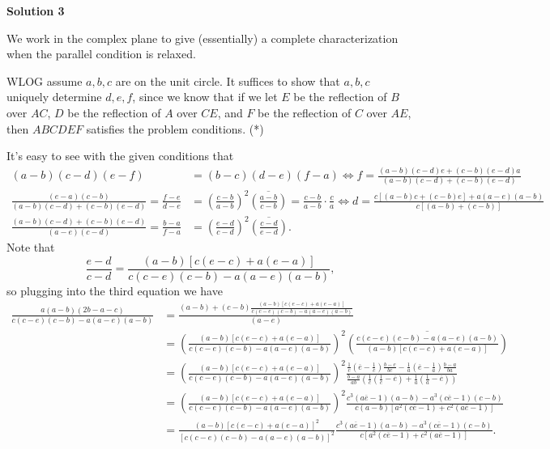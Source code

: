 \begin{enumerate}
 



\textbf{Solution 3}

We work in the complex plane to give (essentially) a complete characterization when the parallel condition is relaxed.

 WLOG assume $a,b,c$ are on the unit circle. It suffices to show that $a,b,c$ uniquely determine $d,e,f$, since we know that if we let $E$ be the reflection of $B$ over $AC$, $D$ be the reflection of $A$ over $CE$, and $F$ be the reflection of $C$ over $AE$, then $ABCDEF$ satisfies the problem conditions. (*)

 It's easy to see with the given conditions that
 \begin{align*} (a-b)(c-d)(e-f) &= (b-c)(d-e)(f-a) \Longleftrightarrow f=\frac{(a-b)(c-d)e+(c-b)(e-d)a}{(a-b)(c-d)+(c-b)(e-d)} \\ \frac{(e-a)(c-b)}{(a-b)(c-d)+(c-b)(e-d)} = \frac{f-e}{d-e} &= \left(\frac{c-b}{a-b}\right)^2 \overline{\left(\frac{a-b}{c-b}\right)} = \frac{c-b}{a-b}\cdot\frac{c}{a} \Longleftrightarrow d=\frac{c[(a-b)c+(c-b)e]+a(a-e)(a-b)}{c[(a-b)+(c-b)]} \\ \frac{(a-b)(c-d)+(c-b)(e-d)}{(a-e)(c-d)} = \frac{b-a}{f-a} &= \left(\frac{e-d}{c-d}\right)^2 \overline{\left(\frac{c-d}{e-d}\right)}. \end{align*}
Note that
 \[\frac{e-d}{c-d}=\frac{(a-b)[c(e-c)+a(e-a)]}{c(c-e)(c-b)-a(a-e)(a-b)},\]so plugging into the third equation we have
 \begin{align*} \frac{a(a-b)(2b-a-c)}{c(c-e)(c-b)-a(a-e)(a-b)} &=\frac{(a-b)+(c-b)\frac{(a-b)[c(e-c)+a(e-a)]}{c(c-e)(c-b)-a(a-e)(a-b)}}{(a-e)}\\ &=\left(\frac{(a-b)[c(e-c)+a(e-a)]}{c(c-e)(c-b)-a(a-e)(a-b)}\right)^2\overline{\left(\frac{c(c-e)(c-b)-a(a-e)(a-b)}{(a-b)[c(e-c)+a(e-a)]}\right)}\\ &=\left(\frac{(a-b)[c(e-c)+a(e-a)]}{c(c-e)(c-b)-a(a-e)(a-b)}\right)^2\frac{\frac{1}{c}\left(\overline{e}-\frac{1}{c}\right)\frac{b-c}{bc}-\frac{1}{a}\left(\overline{e}-\frac{1}{a}\right)\frac{b-a}{ba}}{\frac{b-a}{ab}\left(\frac{1}{c}\left(\frac{1}{c}-\overline{e}\right)+\frac{1}{a}\left(\frac{1}{a}-\overline{e}\right)\right)}\\ &=\left(\frac{(a-b)[c(e-c)+a(e-a)]}{c(c-e)(c-b)-a(a-e)(a-b)}\right)^2\frac{c^3(a\overline{e}-1)(a-b)-a^3(c\overline{e}-1)(c-b)}{c(a-b)[a^2(c\overline{e}-1)+c^2(a\overline{e}-1)]}\\ &=\frac{(a-b)[c(e-c)+a(e-a)]^2}{[c(c-e)(c-b)-a(a-e)(a-b)]^2}\frac{c^3(a\overline{e}-1)(a-b)-a^3(c\overline{e}-1)(c-b)}{c[a^2(c\overline{e}-1)+c^2(a\overline{e}-1)]}. \end{align*}

\end{enumerate}

